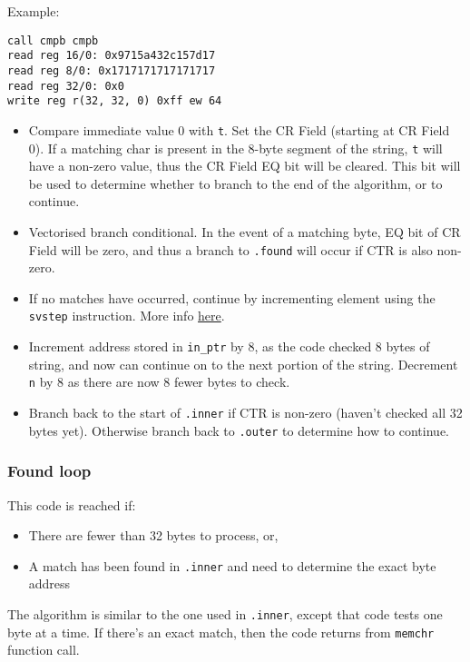 Example:
\begin{verbatim}
call cmpb cmpb
read reg 16/0: 0x9715a432c157d17
read reg 8/0: 0x1717171717171717
read reg 32/0: 0x0
write reg r(32, 32, 0) 0xff ew 64
\end{verbatim}

\begin{itemize}
  \item Compare immediate value 0 with \texttt{t}. Set the \acrshort{CR} Field
  (starting at CR Field 0). If a matching char is present in the 8-byte
  segment of the string, \texttt{t} will have a non-zero value, thus the
  CR Field EQ bit will be cleared. This bit will be used to determine whether
  to branch to the end of the algorithm, or to continue.
  \item Vectorised branch conditional. In the event of a matching byte,
  EQ bit of CR Field will be zero, and thus a branch to \texttt{.found}
  will occur if CTR is also non-zero.
  \item If no matches have occurred, continue by incrementing element using
  the \texttt{svstep} instruction. More info
  \href{https://libre-soc.org/openpower/sv/svstep/}{here}.
  \item Increment address stored in \texttt{in\_ptr} by 8, as the code checked
  8 bytes of string, and now can continue on to the next portion of the string.
  Decrement \texttt{n} by 8 as there are now 8 fewer bytes to check.
  \item Branch back to the start of \texttt{.inner} if CTR is non-zero
  (haven't checked all 32 bytes yet). Otherwise branch back to \texttt{.outer}
  to determine how to continue.
\end{itemize}

\subsubsection{Found loop}

This code is reached if:

\begin{itemize}
  \item There are fewer than 32 bytes to process, or,
  \item A match has been found in \texttt{.inner} and need to determine the
  exact byte address
\end{itemize}

The algorithm is similar to the one used in \texttt{.inner}, except that code tests
one byte at a time. If there's an exact match, then the code returns from
\texttt{memchr} function call.

